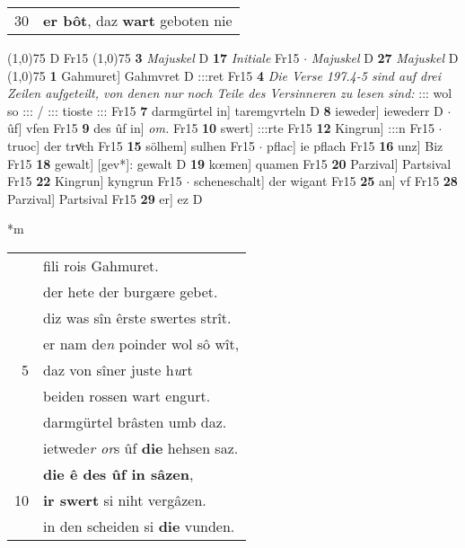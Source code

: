 \documentclass[8pt,a4paper,notitlepage]{article}
\begin{document}
\begin{table}[ht]
\begin{minipage}[t]{0.5\linewidth}
\begin{tabular}{rl}
30 & \textbf{er bôt}, daz \textbf{wart} geboten nie\\ 
\end{tabular}
\scriptsize
\line(1,0){75} \newline
D Fr15 \newline
\line(1,0){75} \newline
\textbf{3} \textit{Majuskel} D  \textbf{17} \textit{Initiale} Fr15   $\cdot$ \textit{Majuskel} D  \textbf{27} \textit{Majuskel} D  \newline
\line(1,0){75} \newline
\textbf{1} Gahmuret] Gahmvret D :::ret Fr15 \textbf{4} \textit{Die Verse 197.4-5 sind auf drei Zeilen aufgeteilt, von denen nur noch Teile des Versinneren zu lesen sind:} ::: wol so ::: / ::: tioste ::: Fr15  \textbf{7} darmgürtel in] taremgvrteln D \textbf{8} ieweder] iewederr D  $\cdot$ ûf] vfen Fr15 \textbf{9} des ûf in] \textit{om.} Fr15 \textbf{10} swert] :::rte Fr15 \textbf{12} Kingrun] :::n Fr15  $\cdot$ truoc] der trvͦch Fr15 \textbf{15} sölhem] sulhen Fr15  $\cdot$ pflac] ie pflach Fr15 \textbf{16} unz] Biz Fr15 \textbf{18} gewalt] [gev*]: gewalt D \textbf{19} kœmen] quamen Fr15 \textbf{20} Parzival] Partsival Fr15 \textbf{22} Kingrun] kyngrun Fr15  $\cdot$ scheneschalt] der wigant Fr15 \textbf{25} an] vf Fr15 \textbf{28} Parzival] Partsival Fr15 \textbf{29} er] ez D \newline
\end{minipage}
\hspace{0.5cm}
\begin{minipage}[t]{0.5\linewidth}
\small
\begin{center}*m
\end{center}
\begin{tabular}{rl}
 & fili rois Gahmuret.\\ 
 & der hete der burgære gebet.\\ 
 & diz was sîn êrste swertes strît.\\ 
 & er nam de\textit{n} poinder wol sô wît,\\ 
5 & daz von sîner juste h\textit{u}rt\\ 
 & beiden rossen wart engurt.\\ 
 & darmgürtel brâsten umb daz.\\ 
 & ietwede\textit{r or}s ûf \textbf{die} hehsen saz.\\ 
 & \textbf{die ê des ûf in sâzen},\\ 
10 & \textbf{ir swert} si niht vergâzen.\\ 
 & in den scheiden si \textbf{die} vunden.\\ 

\end{tabular}
\end{minipage}
\end{table}
\end{document}
